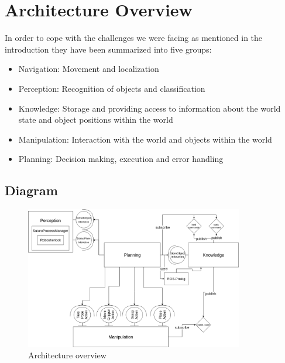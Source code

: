 \documentclass[main.tex]{subfiles}
\begin{document}
	\begingroup

	\renewcommand{\cleardoublepage}{}

	\renewcommand{\clearpage}{}

	\chapter{Architecture Overview}
		In order to cope with the challenges we were facing as mentioned in the introduction they have been summarized into five groups:

		\begin{itemize}
			\item Navigation: Movement and localization
			\item Perception: Recognition of objects and classification
			\item Knowledge: Storage and providing access to information about the world state and object positions within the world
			\item Manipulation: Interaction with the world and objects within the world
			\item Planning: Decision making, execution and error handling
		\end{itemize}


		\chapterauthor{}
		
		\section{Diagram}
		
		\begin{figure}	
			\centering
			\includegraphics[width=0.85\textwidth]{pictures/diagramms/architecture.png}
			\caption{Architecture overview}
			\label{architecture}
		\end{figure}
		
\end{document}

